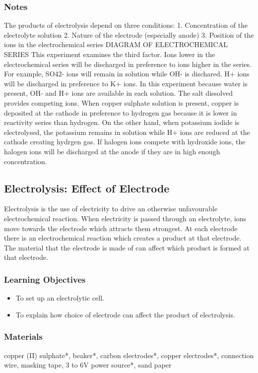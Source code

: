 \subsubsection*{Notes}
The products of electrolysis depend on three conditions:
1. Concentration of the electrolyte solution
2. Nature of the electrode (especially anode)
3. Position of the ions in the electrochemical series
DIAGRAM OF ELECTROCHEMICAL SERIES
This experiment examines the third factor. Ions lower in the electrochemical series will be discharged in preference to ions higher in the series. For example, SO42- ions will remain in solution while OH- is dischared. H+ ions will be discharged in preference to K+ ions.
In this experiment because water is present, OH- and H+ ions are available in each solution. The salt dissolved provides competing ions. When copper sulphate solution is present, copper is deposited at the cathode in preference to hydrogen gas because it is lower in reactivity series than hydrogen. On the other hand, when potassium iodide is electrolysed, the potassium remains in solution while H+ ions are reduced at the cathode creating hydrgen gas.
If halogen ions compete with hydroxide ions, the halogen ions will be discharged at the anode if they are in high enough concentration.

\subsection{Electrolysis: Effect of Electrode}

Electrolysis is the use of electricity to drive an otherwise unfavourable electrochemical reaction. When electricity is passed through an electrolyte, ions move towards the electrode which attracts them strongest. At each electrode there is an electrochemical reaction which creates a product at that electrode. The material that the electrode is made of can affect which product is formed at that electrode.

\subsubsection*{Learning Objectives}
\begin{itemize}
\item{To set up an electrolytic cell.}
\item{To explain how choice of electrode can affect the product of electrolysis.}
\end{itemize}

\subsubsection*{Materials}
copper (II) sulphate*, beaker*, carbon electrodes*, copper electrodes*, connection wire, masking tape, 3 to 6V power source*, sand paper


